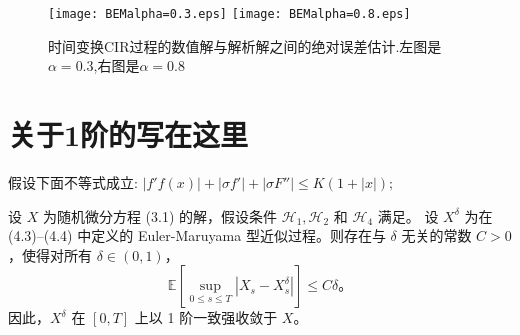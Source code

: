 \begin{figure}[htp!]
	\centering
	\texttt{[image: BEMalpha=0.3.eps]}
	\hfill
	\texttt{[image: BEMalpha=0.8.eps]}
	\caption{时间变换CIR过程的数值解与解析解之间的绝对误差估计.左图是$\alpha=0.3$,右图是$\alpha=0.8$}
	\label{fig:image}
	\vspace{-2ex}
\end{figure}


\section{关于1阶的写在这里}


\begin{assumption}
	假设下面不等式成立:
	$|f' f(x)| + |\sigma f'| + |\sigma F''| \leq K(1 + |x|);$
\end{assumption}

\begin{theorem}
	设 $X$ 为随机微分方程 (3.1) 的解，假设条件 $\mathcal{H}_1, \mathcal{H}_2$ 和 $\mathcal{H}_4$ 满足。
	设 $X^{\delta}$ 为在 (4.3)–(4.4) 中定义的 Euler-Maruyama 型近似过程。则存在与 $\delta$ 无关的常数 $C > 0$，使得对所有 $\delta \in (0,1)$，
	\[
	\mathbb{E} \left[ \sup_{0 \leq s \leq T} | X_s - X_s^\delta | \right] \leq C \delta。
	\]
	因此，$X^\delta$ 在 $[0, T]$ 上以 1 阶一致强收敛于 $X$。
\end{theorem}

